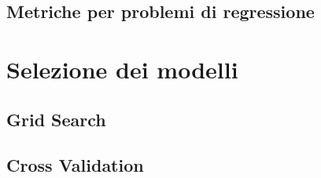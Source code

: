 
\subsection{Metriche per problemi di regressione}


\section{Selezione dei modelli}\label{sec:model_selection}
\subsection{Grid Search}
\subsection{Cross Validation}